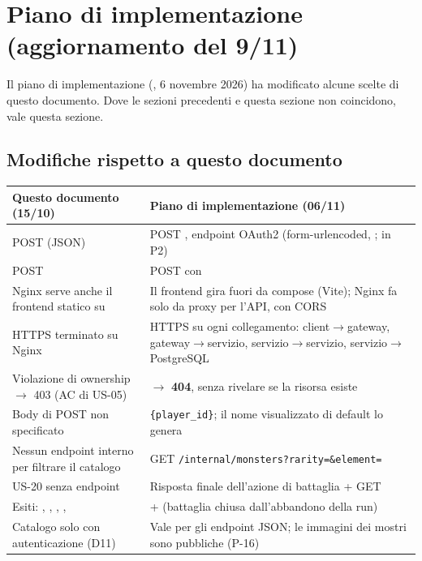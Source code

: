 \documentclass[11pt,a4paper]{article}
\begin{document}
\section{Piano di implementazione (aggiornamento del 9/11)}\label{sec:aggiornamento}

Il piano di implementazione (, 6 novembre 2026) ha modificato alcune scelte di questo documento. Dove le sezioni precedenti e questa sezione non coincidono, vale questa sezione.

\subsection{Modifiche rispetto a questo documento}

\begin{xltabular}{\linewidth}{@{}L{6.2cm}Y@{}}
  \toprule
  Questo documento (15/10) & Piano di implementazione (06/11) \\
  \midrule
  \endhead
  POST  (JSON) & POST , endpoint OAuth2 (form-urlencoded, ;  in P2) \\
  POST  & POST  con  \\
  Nginx serve anche il frontend statico su \ep{/} & Il frontend gira fuori da compose (Vite); Nginx fa solo da proxy per l'API, con CORS \\
  HTTPS terminato su Nginx & HTTPS su ogni collegamento: client$\to$gateway, gateway$\to$servizio, servizio$\to$servizio, servizio$\to$PostgreSQL \\
  Violazione di ownership $\to$ 403 (AC di US-05) & $\to$ \textbf{404}, senza rivelare se la risorsa esiste \\
  Body di POST  non specificato & \texttt{\{player\_id\}}; il nome visualizzato di default lo genera  \\
  Nessun endpoint interno per filtrare il catalogo & GET \texttt{/internal/monsters?rarity=\&element=} \\
  US-20 senza endpoint & Risposta finale dell'azione di battaglia + GET  \\
  Esiti: , , , ,  & +  (battaglia chiusa dall'abbandono della run) \\
  Catalogo solo con autenticazione (D11) & Vale per gli endpoint JSON; le immagini dei mostri sono pubbliche (P-16) \\
  \bottomrule
\end{xltabular}
\end{document}

